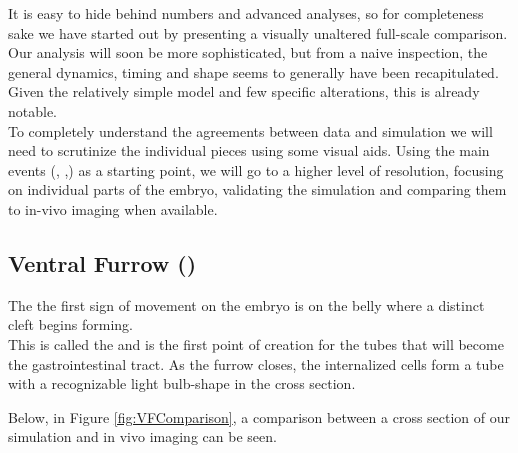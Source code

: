 It is easy to hide behind numbers and advanced analyses, so for completeness sake we have started out by presenting a visually unaltered full-scale comparison. Our analysis will soon be more sophisticated, but from a naive inspection, the general dynamics, timing and shape seems to generally have been recapitulated. Given the relatively simple model and few specific alterations, this is already notable.\\ To completely understand the agreements between data and simulation we will need to scrutinize the individual pieces using some visual aids. Using the main events (, ,) as a starting point, we will go to a higher level of resolution, focusing on individual parts of the embryo, validating the simulation and comparing them to in-vivo imaging when available.


\subsection{Ventral Furrow ()}
The the first sign of movement on the embryo is on the belly where a distinct cleft begins forming. \\
This is called the  and is the first point of creation for the tubes that will become the gastrointestinal tract.
As the furrow closes, the internalized cells form a tube with a recognizable light bulb-shape in the cross section. 

Below, in Figure \ref{fig:VFComparison}, a comparison between a cross section of our simulation and in vivo imaging can be seen.

